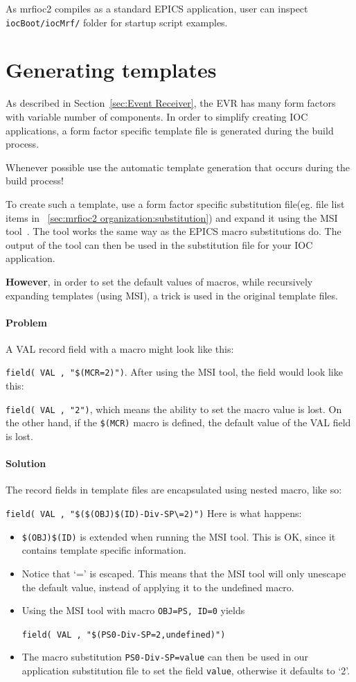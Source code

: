 \documentclass[12pt,a4paper]{article}
\let\stdsection\section
\renewcommand\section{\newpage\stdsection}
\begin{document}
As mrfioc2 compiles as a standard EPICS application, user can inspect \texttt{iocBoot/iocMrf/} folder for startup script examples.

\section{Generating templates}\label{sec:Generating templates}
As described in Section~\ref{sec:Event Receiver}, the EVR has many form factors with variable number of components. In order to simplify creating IOC applications, a form factor specific template file is generated during the build process.

Whenever possible use the automatic template generation that occurs during the build process!

To create such a template, use a form factor specific substitution file(eg. file list items in ~\ref{sec:mrfioc2 organization:substitution}) and expand it using the
MSI tool~\cite{msi}. The tool works the same way as the EPICS macro substitutions do. The output of
the tool can then be used in the substitution file for your IOC application.

\textbf{However}, in order to set the default values of macros, while
recursively expanding templates (using MSI), a trick is used in the original template files.

\paragraph{Problem}\label{problem}
A VAL record field with a macro might look like this:

\texttt{field( VAL , "\$(MCR=2)")}. 
After using the MSI tool, the field would look like this: 

\texttt{field( VAL , "2")}, 
which means the ability to set the macro value is lost. On the other hand, if the \texttt{\$(MCR)} macro is defined, the default value of the VAL field is lost.

\paragraph{Solution}\label{solution}
The record fields in template files are encapsulated using nested macro, like so:

\texttt{field( VAL , "\$(\$(OBJ)\$(ID)-Div-SP\textbackslash{}=2)")} 
Here is what happens: 
\begin{itemize}
\item 
	\texttt{\$(OBJ)\$(ID)} is extended when running the MSI tool.
This is OK, since it contains template specific information.
\item 
	Notice that `=' is escaped. This means that the MSI tool will only unescape the
default value, instead of applying it to the undefined macro. 
\item  
	Using the MSI tool with macro \texttt{OBJ=PS, ID=0} yields
	
\texttt{field( VAL , "\$(PS0-Div-SP=2,undefined)")} 
\item 
	The macro substitution \texttt{PS0-Div-SP=value} can then be used in our application substitution file to set the field \texttt{value}, otherwise it defaults to `2'.
\end{itemize}
\end{document}
